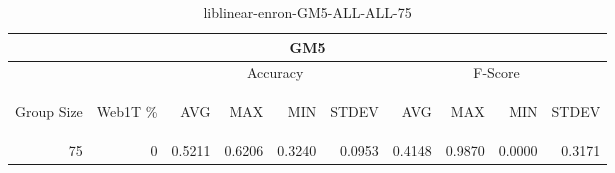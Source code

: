 \begin{center}
\begin{table}[htbp] 
 \begin{center}
\begin{tabular}{ | r | r | r | r | r | r | r | r | r | r |}
\hline
\multicolumn{10}{|c|}{GM5}\\
\hline
 & & \multicolumn{4}{|c|}{Accuracy} & \multicolumn{4}{|c|}{F-Score}\\ \cline{3-10}
\begin{sideways}Group Size\end{sideways} & \begin{sideways}Web1T \%\end{sideways} & \begin{sideways}AVG\end{sideways} & \begin{sideways}MAX\end{sideways} & \begin{sideways}MIN\end{sideways} & \begin{sideways}STDEV\end{sideways} & \begin{sideways}AVG\end{sideways} & \begin{sideways}MAX\end{sideways} & \begin{sideways}MIN\end{sideways} & \begin{sideways}STDEV\end{sideways}\\
\hline
\multirow{0}{*}{75}
 & 0 & 0.5211 & 0.6206 & 0.3240 & 0.0953 & 0.4148 & 0.9870 & 0.0000 & 0.3171\\ \cline{2-10}
\hline
\end{tabular}
\caption{liblinear-enron-GM5-ALL-ALL-75}
\label{table:liblinear-enron-GM5-ALL-ALL-75}
\end{center}
 \end{table}
\end{center}

